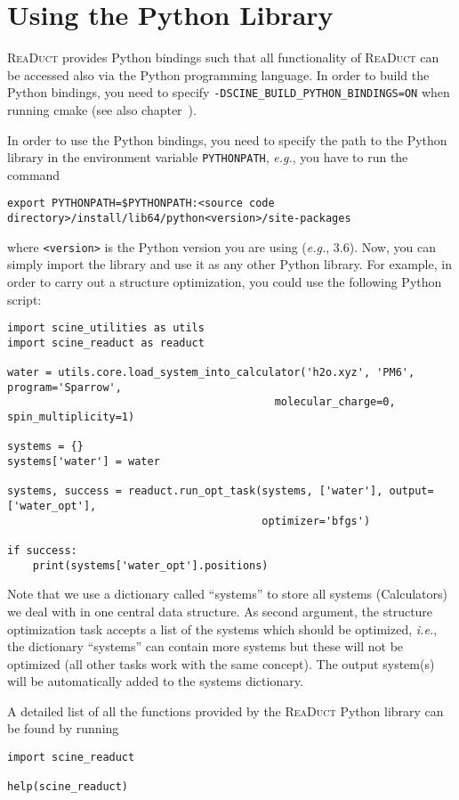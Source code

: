 \documentclass[]{tufte-book}
\begin{document}
\chapter{Using the Python Library}

\textsc{ReaDuct} provides Python bindings such that all functionality of \textsc{ReaDuct} can be accessed also via the
Python programming language. In order to build the Python bindings, you need to specify \texttt{-DSCINE\_BUILD\_PYTHON\_BINDINGS=ON}
when running cmake (see also chapter~).

In order to use the Python bindings, you need to specify the path to the Python library in the environment variable
\texttt{PYTHONPATH}, \textit{e.g.}, you have to run the command
\begin{verbatim}
export PYTHONPATH=$PYTHONPATH:<source code directory>/install/lib64/python<version>/site-packages
\end{verbatim}
where \texttt{<version>} is the Python version you are using (\textit{e.g.}, 3.6). Now, you can simply import the library
and use it as any other Python library. For example, in order to carry out a structure optimization, you could use the
following Python script:
\begin{verbatim}
import scine_utilities as utils
import scine_readuct as readuct

water = utils.core.load_system_into_calculator('h2o.xyz', 'PM6', program='Sparrow',
                                          molecular_charge=0, spin_multiplicity=1)

systems = {}
systems['water'] = water

systems, success = readuct.run_opt_task(systems, ['water'], output=['water_opt'],
                                        optimizer='bfgs')

if success:
    print(systems['water_opt'].positions)
\end{verbatim}
Note that we use a dictionary called ``systems'' to store all systems (Calculators) we deal with in one central data
structure. As second argument, the structure optimization task accepts a list of the systems which should be optimized,
\textit{i.e.}, the dictionary ``systems'' can contain more systems but these will not be optimized (all other tasks
work with the same concept). The output system(s) will be automatically added to the systems dictionary.

A detailed list of all the functions provided by the \textsc{ReaDuct} Python library can be found by running
\begin{verbatim}
import scine_readuct

help(scine_readuct)
\end{verbatim}
\end{document}
